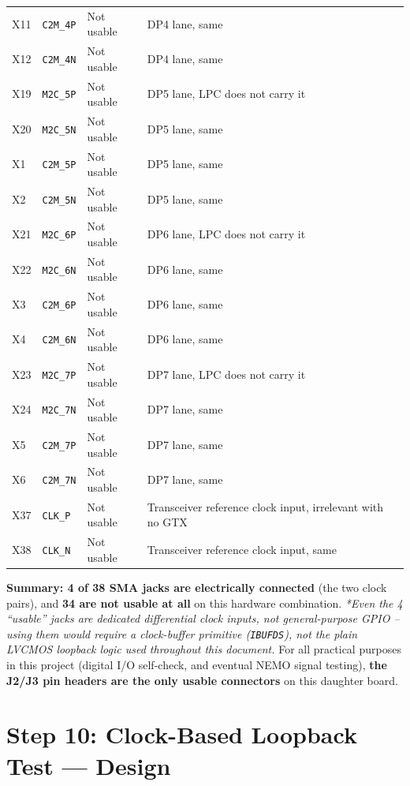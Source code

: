\documentclass[11pt]{article}
\begin{document}
\begin{center}
\begin{tabular}{@{}llll@{}}
X11 & \texttt{C2M\_4P} & Not usable & DP4 lane, same \\
X12 & \texttt{C2M\_4N} & Not usable & DP4 lane, same \\
X19 & \texttt{M2C\_5P} & Not usable & DP5 lane, LPC does not carry it \\
X20 & \texttt{M2C\_5N} & Not usable & DP5 lane, same \\
X1  & \texttt{C2M\_5P} & Not usable & DP5 lane, same \\
X2  & \texttt{C2M\_5N} & Not usable & DP5 lane, same \\
X21 & \texttt{M2C\_6P} & Not usable & DP6 lane, LPC does not carry it \\
X22 & \texttt{M2C\_6N} & Not usable & DP6 lane, same \\
X3  & \texttt{C2M\_6P} & Not usable & DP6 lane, same \\
X4  & \texttt{C2M\_6N} & Not usable & DP6 lane, same \\
X23 & \texttt{M2C\_7P} & Not usable & DP7 lane, LPC does not carry it \\
X24 & \texttt{M2C\_7N} & Not usable & DP7 lane, same \\
X5  & \texttt{C2M\_7P} & Not usable & DP7 lane, same \\
X6  & \texttt{C2M\_7N} & Not usable & DP7 lane, same \\
X37 & \texttt{CLK\_P} & Not usable & Transceiver reference clock input, irrelevant with no GTX \\
X38 & \texttt{CLK\_N} & Not usable & Transceiver reference clock input, same \\
\bottomrule
\end{tabular}
\end{center}

\textbf{Summary: 4 of 38 SMA jacks are electrically connected} (the two clock pairs), and
\textbf{34 are not usable at all} on this hardware combination. \textit{*Even the 4
``usable'' jacks are dedicated differential clock inputs, not general-purpose GPIO --
using them would require a clock-buffer primitive (\texttt{IBUFDS}), not the plain
LVCMOS loopback logic used throughout this document.} For all practical purposes in this
project (digital I/O self-check, and eventual NEMO signal testing), \textbf{the J2/J3
pin headers are the only usable connectors} on this daughter board.

\section{Step 10: Clock-Based Loopback Test --- Design}
\label{sec:clocktest}
\end{document}
